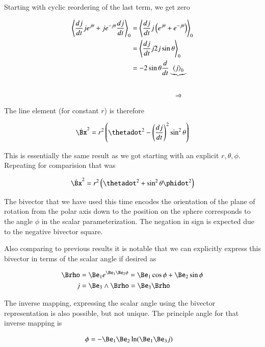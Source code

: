Starting with cyclic reordering of the last term, we get zero

\begin{align*}
{\left\langle{{ \frac{dj}{dt} j e^{j\theta} + j e^{-j\theta} \frac{dj}{dt} }}\right\rangle}_{0} 
&=
{\left\langle{{ \frac{dj}{dt} j \left( e^{j\theta} + e^{-j\theta} \right) }}\right\rangle}_{0}  \\
&=
{\left\langle{{ \frac{dj}{dt} j 2 j \sin\theta }}\right\rangle}_{0}  \\
&=
- 2 \sin\theta \frac{d}{dt} \underbrace{{\left\langle{{ j }}\right\rangle}_{0}}_{=0}  \\
\end{align*}

The line element (for constant $r$) is therefore

\begin{align}\label{eqn:sphericalPolarUnit:zoo4}
\dot{\Bx}^2 
=
r^2 \left( \thetadot^2 - \left(\frac{dj}{dt}\right)^2 \sin^2 \theta \right)
\end{align}

This is essentially the same result as we got starting with an explicit $r, \theta, \phi$.  Repeating for comparision that was

\begin{align}\label{eqn:sphericalPolarUnit:zoo5}
\dot{\Bx}^2 = r^2 \left( \thetadot^2 + \sin^2\theta \phidot^2 \right)
\end{align}

The bivector that we have used this time encodes the orientation of the plane of rotation from the polar axis down to the position on the sphere corresponds to the angle $\phi$ in the 
scalar parameterization.  The negation in sign is expected due to the negative bivector square.

Also comparing to previous results it is notable that we can explicitly express this bivector in terms of the scalar angle if desired as

\begin{align}\label{eqn:sphericalPolarUnit:zoo6}
\Brho &= \Be_1 e^{\Be_1 \Be_2 \phi} = \Be_1 \cos\phi + \Be_2 \sin\phi \\
j &= \Be_3 \wedge \Brho = \Be_3 \Brho
\end{align}

The inverse mapping, expressing the scalar angle using the bivector representation is also possible, but not unique.  The principle angle for that inverse mapping is

\begin{align}\label{eqn:sphericalPolarUnit:zoo7}
\phi &= -\Be_1 \Be_2 \ln(\Be_1 \Be_3 j) 
\end{align}

